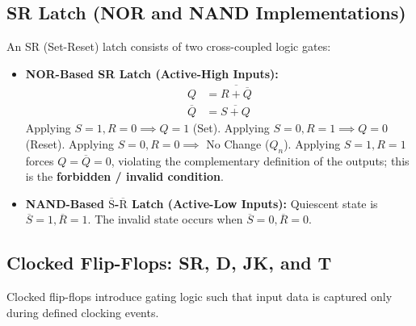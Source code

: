 \subsection{SR Latch (NOR and NAND Implementations)}
An SR (Set-Reset) latch consists of two cross-coupled logic gates:
\begin{itemize}
    \item \textbf{NOR-Based SR Latch (Active-High Inputs):}
    \begin{align}
    Q &= \overline{R + \overline{Q}} \\
    \overline{Q} &= \overline{S + Q}
    \end{align}
    Applying $S=1, R=0 \implies Q=1$ (Set). Applying $S=0, R=1 \implies Q=0$ (Reset). Applying $S=0, R=0 \implies$ No Change ($Q_n$). Applying $S=1, R=1$ forces $Q = \overline{Q} = 0$, violating the complementary definition of the outputs; this is the \textbf{forbidden / invalid condition}.
    \item \textbf{NAND-Based $\overline{\text{S}}$-$\overline{\text{R}}$ Latch (Active-Low Inputs):}
    Quiescent state is $\overline{S} = 1, \overline{R} = 1$. The invalid state occurs when $\overline{S} = 0, \overline{R} = 0$.
\end{itemize}

\subsection{Clocked Flip-Flops: SR, D, JK, and T}
Clocked flip-flops introduce gating logic such that input data is captured only during defined clocking events.

